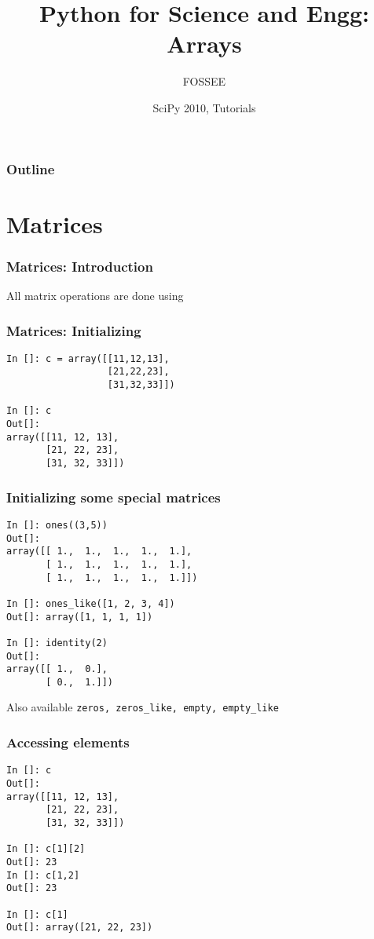 \documentclass[14pt,compress]{beamer}
\title[Arrays]{Python for Science and Engg: Arrays}
\author[FOSSEE] {FOSSEE}
\institute[IIT Bombay] {Department of Aerospace Engineering\\IIT Bombay}
\date[] {SciPy 2010, Tutorials}
\newcommand{\typ}[1]{\lstinline{#1}}
\newcommand{\kwrd}[1]{ \texttt{\textbf{\color{blue}{#1}}}  }
\begin{document}
\begin{frame}
  \titlepage
\end{frame}

\begin{frame}
  \frametitle{Outline}
  \tableofcontents
\end{frame}

\section{Matrices}

\begin{frame}
\frametitle{Matrices: Introduction}
\alert{All matrix operations are done using \kwrd{arrays}}
\end{frame}

\begin{frame}[fragile]
\frametitle{Matrices: Initializing}
\begin{lstlisting}
In []: c = array([[11,12,13],
                  [21,22,23],
                  [31,32,33]])

In []: c
Out[]: 
array([[11, 12, 13],
       [21, 22, 23],
       [31, 32, 33]])
\end{lstlisting}
\end{frame}

\begin{frame}[fragile]
\frametitle{Initializing some special matrices}
\begin{small}
  \begin{lstlisting}
In []: ones((3,5))
Out[]: 
array([[ 1.,  1.,  1.,  1.,  1.],
       [ 1.,  1.,  1.,  1.,  1.],
       [ 1.,  1.,  1.,  1.,  1.]])

In []: ones_like([1, 2, 3, 4]) 
Out[]: array([1, 1, 1, 1])   

In []: identity(2)
Out[]: 
array([[ 1.,  0.],
       [ 0.,  1.]])
  \end{lstlisting}
Also available \alert{\typ{zeros, zeros_like, empty, empty_like}}
\end{small}
\end{frame}


\begin{frame}[fragile]
  \frametitle{Accessing elements}
  \begin{small}
  \begin{lstlisting}
In []: c
Out[]: 
array([[11, 12, 13],
       [21, 22, 23],
       [31, 32, 33]])

In []: c[1][2]
Out[]: 23
In []: c[1,2]
Out[]: 23

In []: c[1]
Out[]: array([21, 22, 23])
  \end{lstlisting}
  \end{small}
\end{frame}
\end{document}
